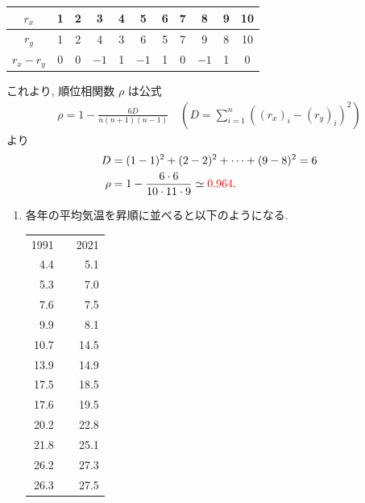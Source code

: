 \begin{qenumerate}
{		\begin{table}[H]
			\centering
			\begin{tabular}{c|cccccccccc} \hline
				$r_{x}$         & 1 & 2 & 3    & 4 & 5    & 6 & 7 & 8    & 9 & 10 \\ \hline
				$r_{y}$         & 1 & 2 & 4    & 3 & 6    & 5 & 7 & 9    & 8 & 10 \\ \hline
				$r_{x} - r_{y}$ & 0 & 0 & $-1$ & 1 & $-1$ & 1 & 0 & $-1$ & 1 & 0  \\ \hline
			\end{tabular}
		\end{table}
		これより, 順位相関数 $\rho$ は公式
		\begin{align}
			\rho = 1 - \frac{6D}{n(n + 1)(n - 1)}\quad \left(D = \sum_{i = 1}^{n}{\left((r_{x})_{i} - (r_{y})_{i}\right)^{2}}\right)
		\end{align}
		より
		\begin{align}
			D &= (1 - 1)^{2} + (2 - 2)^{2} + \cdots + (9 - 8)^{2} = 6 \\
			\rho &= 1 - \frac{6\cdot 6}{10\cdot 11 \cdot 9} \simeq \textcolor{red}{0.964}.
		\end{align}
	}
	\item{
		\begin{enumerate}
			\item{
				各年の平均気温を昇順に並べると以下のようになる.
				\begin{table}[H]
					\centering
					\begin{tabular}{rcr}
						\multicolumn{1}{c}{1991} & & \multicolumn{1}{c}{2021} \\ \cline{1-1}\cline{3-3}
						 4.4 & &  5.1 \\
						 5.3 & &  7.0 \\
						 7.6 & &  7.5 \\ \cline{1-1}\cline{3-3}
						 9.9 & &  8.1 \\
						10.7 & & 14.5 \\
						13.9 & & 14.9 \\ \cline{1-1}\cline{3-3}
						17.5 & & 18.5 \\
						17.6 & & 19.5 \\
						20.2 & & 22.8 \\ \cline{1-1}\cline{3-3}
						21.8 & & 25.1 \\
						26.2 & & 27.3 \\
						26.3 & & 27.5 \\
					\end{tabular}
				\end{table}
}
\end{enumerate}}
\end{qenumerate}
